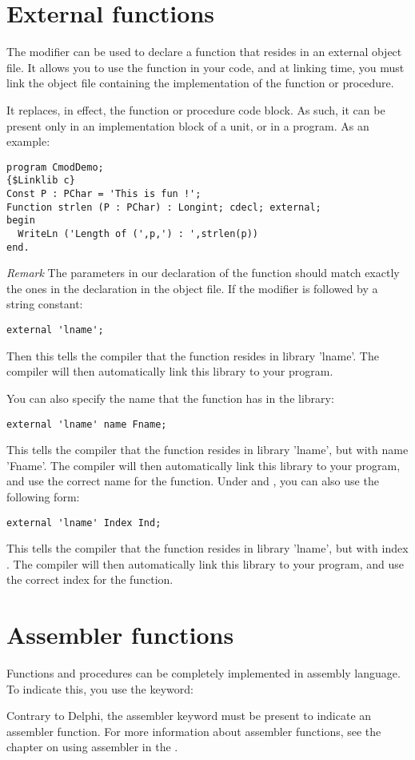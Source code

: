 \documentclass{report}
\begin{document}
\section{External functions}
\label{se:external}
The  modifier can be used to declare a function that resides in
an external object file. It allows you to use the function in
your code, and at linking time, you must link the object file containing the
implementation of the function or procedure.

It replaces, in effect, the function or procedure code block. As such, it
can be present only in an implementation block of a unit, or in a program.
As an example:
\begin{verbatim}
program CmodDemo;
{$Linklib c}
Const P : PChar = 'This is fun !';
Function strlen (P : PChar) : Longint; cdecl; external;
begin
  WriteLn ('Length of (',p,') : ',strlen(p))
end.
\end{verbatim}
{\em Remark} The parameters in our declaration of the  function
should match exactly the ones in the declaration in the object file.
If the  modifier is followed by a string constant:
\begin{verbatim}
external 'lname';
\end{verbatim}
Then this tells the compiler that the function resides in library
'lname'. The compiler will then automatically link this library to
your program.

You can also specify the name that the function has in the library:
\begin{verbatim}
external 'lname' name Fname;
\end{verbatim}
This tells the compiler that the function resides in library 'lname',
but with name 'Fname'. The compiler will then automatically link this
library to your program, and use the correct name for the function.
Under \windows and \ostwo, you can also use the following form:
\begin{verbatim}
external 'lname' Index Ind;
\end{verbatim}
This tells the compiler that the function resides in library 'lname',
but with index . The compiler will then automatically
link this library to your program, and use the correct index for the
function.

\section{Assembler functions}
Functions and procedures can be completely implemented in assembly
language. To indicate this, you use the  keyword:

Contrary to Delphi, the assembler keyword must be present to indicate an
assembler function.
For more information about assembler functions, see the chapter on using
assembler in the \progref.
\end{document}
